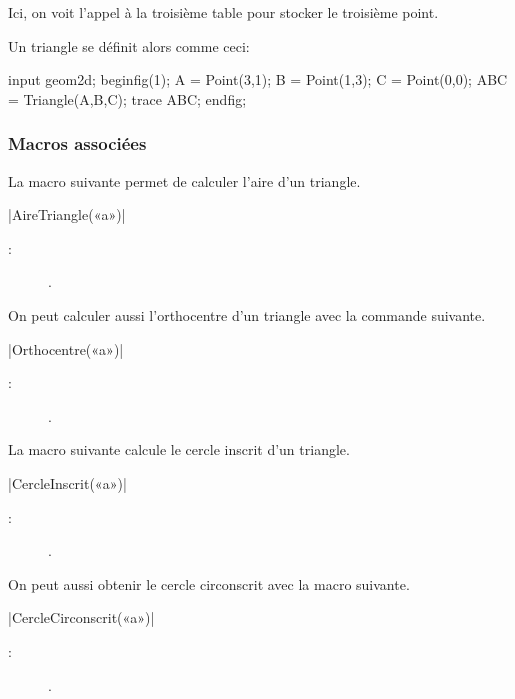 \documentclass[a4paper,french]{article}
\begin{document}
\bigskip

Ici, on voit l'appel à la troisième table  pour stocker le
troisième point.

Un triangle se définit alors comme ceci:
\begin{ExempleMP}
input geom2d;
beginfig(1);
A = Point(3,1);
B = Point(1,3);
C = Point(0,0);
ABC = Triangle(A,B,C);
trace ABC;
endfig;
\end{ExempleMP}

\subsubsection{Macros associées}

La macro suivante permet de calculer l'aire d'un triangle.
\begin{colourband}
\macro|AireTriangle(«a»)|
\begin{description}
  \item[:]  .
\end{description}
\end{colourband}

On peut calculer aussi l'orthocentre d'un triangle avec la commande suivante.
\begin{colourband}
\macro|Orthocentre(«a»)|
\begin{description}
  \item[:]  .
\end{description}
\end{colourband}

La macro suivante calcule le cercle inscrit d'un triangle.
\begin{colourband}
\macro|CercleInscrit(«a»)|
\begin{description}
  \item[:]  .
\end{description}
\end{colourband}

On peut aussi obtenir le cercle circonscrit avec la macro suivante.
\begin{colourband}
\macro|CercleCirconscrit(«a»)|
\begin{description}
  \item[:]  .
\end{description}
\end{colourband}
\end{document}
